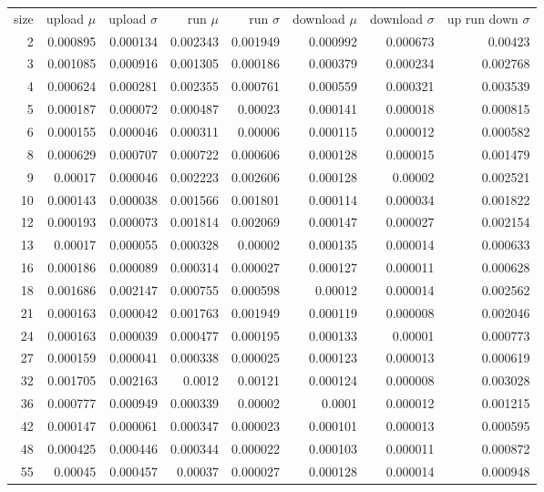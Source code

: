 \begin{longtable}{r r r r r r r r}
size & upload $\mu$  & upload $\sigma$ & run $\mu$ & run $\sigma$ & download $\mu$ & download $\sigma$ & up run down $\sigma$ \\
2 & 0.000895 & 0.000134 & 0.002343 & 0.001949 & 0.000992 & 0.000673 & 0.00423 \\
3 & 0.001085 & 0.000916 & 0.001305 & 0.000186 & 0.000379 & 0.000234 & 0.002768 \\
4 & 0.000624 & 0.000281 & 0.002355 & 0.000761 & 0.000559 & 0.000321 & 0.003539 \\
5 & 0.000187 & 0.000072 & 0.000487 & 0.00023 & 0.000141 & 0.000018 & 0.000815 \\
6 & 0.000155 & 0.000046 & 0.000311 & 0.00006 & 0.000115 & 0.000012 & 0.000582 \\
8 & 0.000629 & 0.000707 & 0.000722 & 0.000606 & 0.000128 & 0.000015 & 0.001479 \\
9 & 0.00017 & 0.000046 & 0.002223 & 0.002606 & 0.000128 & 0.00002 & 0.002521 \\
10 & 0.000143 & 0.000038 & 0.001566 & 0.001801 & 0.000114 & 0.000034 & 0.001822 \\
12 & 0.000193 & 0.000073 & 0.001814 & 0.002069 & 0.000147 & 0.000027 & 0.002154 \\
13 & 0.00017 & 0.000055 & 0.000328 & 0.00002 & 0.000135 & 0.000014 & 0.000633 \\
16 & 0.000186 & 0.000089 & 0.000314 & 0.000027 & 0.000127 & 0.000011 & 0.000628 \\
18 & 0.001686 & 0.002147 & 0.000755 & 0.000598 & 0.00012 & 0.000014 & 0.002562 \\
21 & 0.000163 & 0.000042 & 0.001763 & 0.001949 & 0.000119 & 0.000008 & 0.002046 \\
24 & 0.000163 & 0.000039 & 0.000477 & 0.000195 & 0.000133 & 0.00001 & 0.000773 \\
27 & 0.000159 & 0.000041 & 0.000338 & 0.000025 & 0.000123 & 0.000013 & 0.000619 \\
32 & 0.001705 & 0.002163 & 0.0012 & 0.00121 & 0.000124 & 0.000008 & 0.003028 \\
36 & 0.000777 & 0.000949 & 0.000339 & 0.00002 & 0.0001 & 0.000012 & 0.001215 \\
42 & 0.000147 & 0.000061 & 0.000347 & 0.000023 & 0.000101 & 0.000013 & 0.000595 \\
48 & 0.000425 & 0.000446 & 0.000344 & 0.000022 & 0.000103 & 0.000011 & 0.000872 \\
55 & 0.00045 & 0.000457 & 0.00037 & 0.000027 & 0.000128 & 0.000014 & 0.000948 \\

\end{longtable}
